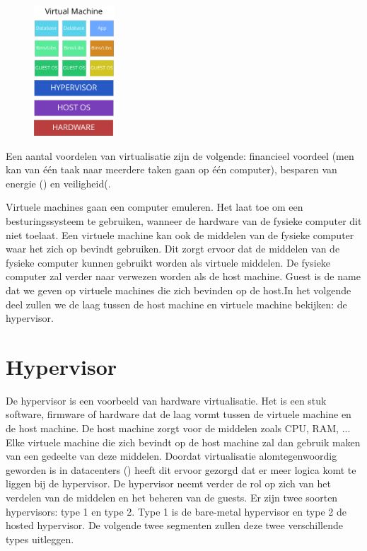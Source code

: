 \documentclass[pdftex,a4paper,12pt,twoside]{report}
\begin{document}
\begin{figure}
    \centering
    \includegraphics[width=3cm]{img/virtual-machine}\\
\end{figure}

Een aantal voordelen van virtualisatie zijn de volgende: financieel voordeel (men kan van één taak naar meerdere taken gaan op één computer), besparen van energie (\cite{Beloglazov2010}) en veiligheid(\cite{Mortleman2009}.

Virtuele machines gaan een computer emuleren. Het laat toe om een besturingssysteem te gebruiken, wanneer de hardware van de fysieke computer dit niet toelaat. Een virtuele machine kan ook de middelen van de fysieke computer waar het zich op bevindt gebruiken. Dit zorgt ervoor dat de middelen van de fysieke computer kunnen gebruikt worden als virtuele middelen. De fysieke computer zal verder naar verwezen worden als de host machine. Guest is de name dat we geven op virtuele machines die zich bevinden op de host.In het volgende deel zullen we de laag tussen de host machine en virtuele machine bekijken: de hypervisor. 

\section{Hypervisor}

De hypervisor is een voorbeeld van hardware virtualisatie. Het is een stuk software, firmware of hardware dat de laag vormt tussen de virtuele machine en de host machine. De host machine zorgt voor de middelen zoals CPU, RAM, ... Elke virtuele machine die zich bevindt op de host machine zal dan gebruik maken van een gedeelte van deze middelen. Doordat virtualisatie alomtegenwoordig geworden is in datacenters (\cite{Soundararajan2010}) heeft dit ervoor gezorgd dat er meer logica komt te liggen bij de hypervisor. De hypervisor neemt verder de rol op zich van het verdelen van de middelen en het beheren van de guests. Er zijn twee soorten hypervisors: type 1 en type 2. Type 1 is de bare-metal hypervisor en type 2 de hosted hypervisor. De volgende twee segmenten zullen deze twee verschillende types uitleggen.
\end{document}
